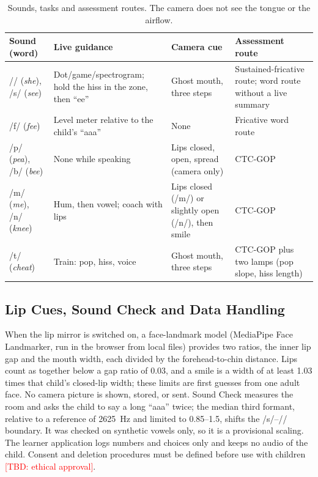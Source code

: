 \documentclass[engproc,article,submit,moreauthors]{Definitions/mdpi}
\newcommand{\tbd}[1]{\textcolor{red}{[TBD: #1]}}
\newcommand{\ipa}[1]{/#1/}
\begin{document}
\begin{table}[!t]
\caption{Sounds, tasks and assessment routes. The camera does not see the tongue or the airflow.\label{tab:tasks}}
\small
\begin{tabularx}{\textwidth}{p{1.9cm}p{4.2cm}p{3.3cm}X}
\toprule
\textbf{Sound (word)} & \textbf{Live guidance} & \textbf{Camera cue} & \textbf{Assessment route}\\
\midrule
\ipa{\textesh} (\textit{she}), \ipa{s} (\textit{see}) & Dot/game/spectrogram; hold the hiss in the zone, then ``ee'' & Ghost mouth, three steps & Sustained-fricative route; word route without a live summary\\
\ipa{f} (\textit{fee}) & Level meter relative to the child's ``aaa'' & None & Fricative word route\\
\ipa{p} (\textit{pea}), \ipa{b} (\textit{bee}) & None while speaking & Lips closed, open, spread (camera only) & CTC-GOP\\
\ipa{m} (\textit{me}), \ipa{n} (\textit{knee}) & Hum, then vowel; coach with lips & Lips closed (\ipa{m}) or slightly open (\ipa{n}), then smile & CTC-GOP\\
\ipa{t\textesh} (\textit{cheat}) & Train: pop, hiss, voice & Ghost mouth, three steps & CTC-GOP plus two lamps (pop slope, hiss length)\\
\bottomrule
\end{tabularx}
\end{table}

\subsection{Lip Cues, Sound Check and Data Handling}
When the lip mirror is switched on, a face-landmark model (MediaPipe Face Landmarker, run in the browser from local files) provides two ratios, the inner lip gap and the mouth width, each divided by the forehead-to-chin distance. Lips count as together below a gap ratio of 0.03, and a smile is a width of at least 1.03 times that child's closed-lip width; these limits are first guesses from one adult face. No camera picture is shown, stored, or sent. Sound Check measures the room and asks the child to say a long ``aaa'' twice; the median third formant, relative to a reference of 2625~Hz and limited to 0.85--1.5, shifts the \ipa{s}--\ipa{\textesh} boundary. It was checked on synthetic vowels only, so it is a provisional scaling. The learner application logs numbers and choices only and keeps no audio of the child. Consent and deletion procedures must be defined before use with children \tbd{ethical approval}.
\end{document}

